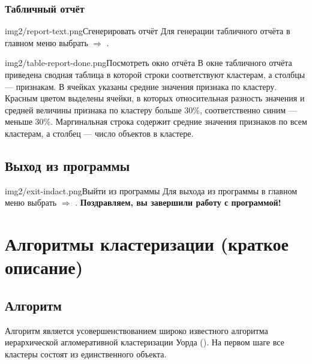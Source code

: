 \documentclass[12pt,tikz]{instruction}
\begin{document}
\newpage
\subsubsection{Табличный отчёт}

\begin{steps}
	\begin{ist}{img2/report-text.png}{Сгенерировать отчёт}
		Для генерации табличного отчёта в главном меню выбрать  $\Rightarrow$ .
	\end{ist}
	\begin{ist}{img2/table-report-done.png}{Посмотреть окно отчёта}
		В окне табличного отчёта приведена сводная таблица в которой строки соответствуют кластерам, а столбцы --- признакам. В ячейках указаны средние значения признака по кластеру. Красным цветом выделены ячейки, в которых относительная разность значения и средней величины признака по кластеру больше 30\%, соответственно синим --- меньше 30\%. Маргинальная строка содержит средние значения признаков по всем кластерам, а столбец --- число объектов в кластере.
	\end{ist}
	
\end{steps}


\newpage
\subsection{Выход из программы}

\begin{steps}
	\begin{ist}{img2/exit-indact.png}{Выйти из программы}
			Для выхода из программы в главном меню выбрать  $\Rightarrow$ . \textbf{Поздравляем, вы завершили работу с программой!}
	\end{ist}
\end{steps}

\section{Алгоритмы кластеризации (краткое описание)}
\label{sec:algs}
\subsection{Алгоритм  \AWard}
\label{subsec:a-ward}
Алгоритм \AWard является усовершенствованием  широко известного алгоритма иерархической агломеративной кластеризации Уорда (\Ward)\cite{ward}. На первом шаге все кластеры состоят из единственного объекта. 
\end{document}
